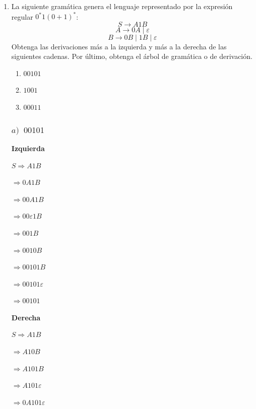 \documentclass[12pt,letterpaper]{article}
\begin{document}
\begin{enumerate}[label=\arabic*.]
\item La siguiente gramática genera el lenguaje representado por la expresión regular $0^*1(0+1)^*$:
  \[
  S \to A1B
  \]
  \[
  A \to 0A \mid \varepsilon
  \]
  \[
  B \to 0B \mid 1B \mid \varepsilon
  \]
  Obtenga las derivaciones más a la izquierda y más a la derecha de las siguientes cadenas. Por último, obtenga el árbol de gramática o de derivación.
  \begin{enumerate}
  \item $00101$
  \item $1001$
  \item $00011$
  \end{enumerate}
  
  \bigskip

  \subsubsection*{$a)\;\; 00101$}
  \begin{center}
    \noindent
    \begin{minipage}[t]{0.30\textwidth}
      \centering
      \textbf{Izquierda}
      
      \vspace{5pt}
      
      $S \Rightarrow A1B$

      $\Rightarrow 0A1B$

      $\Rightarrow 00A1B$

      $\Rightarrow 00\varepsilon1B$

      $\Rightarrow 001B$

      $\Rightarrow 0010B$

      $\Rightarrow 00101B$

      $\Rightarrow 00101\varepsilon$

      $\Rightarrow \boxed{00101}$
    \end{minipage}
    \hfill
    \vrule
    \hfill
    \begin{minipage}[t]{0.30\textwidth}
      \centering
      \textbf{Derecha}

      \vspace{5pt}

      $S \Rightarrow A1B$

      $\Rightarrow A10B$

      $\Rightarrow A10 1B$

      $\Rightarrow A101\varepsilon$

      $\Rightarrow 0A101\varepsilon$


\end{minipage}
\end{center}
\end{enumerate}
\end{document}
